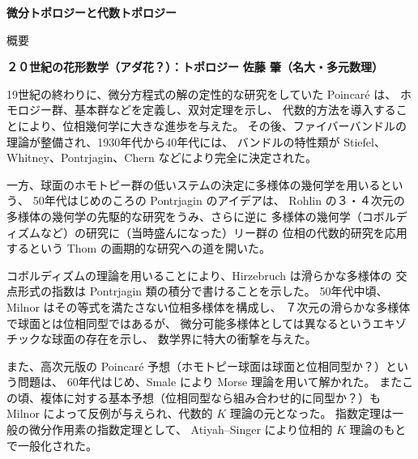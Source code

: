 \documentclass[uplatex,dvipdfmx]{jlreq}
\begin{document}
\begin{center}
  {\Huge\bfseries 微分トポロジーと代数トポロジー}
\end{center}

\vspace{10pt}

\begin{center}
  {\large 概要}
\end{center}

\newpage

\noindent
{\large\bfseries ２０世紀の花形数学（アダ花？）：トポロジー}
\hfill
{\large\bfseries 佐藤 肇（名大・多元数理）}

\medskip

19世紀の終わりに、微分方程式の解の定性的な研究をしていた Poincaré は、
ホモロジー群、基本群などを定義し、双対定理を示し、
代数的方法を導入することにより、位相幾何学に大きな進歩を与えた。
その後、ファイバーバンドルの理論が整備され、1930年代から40年代には、
バンドルの特性類が Stiefel、Whitney、Pontrjagin、Chern などにより完全に決定された。

一方、球面のホモトピー群の低いステムの決定に多様体の幾何学を用いるという、
50年代はじめのころの Pontrjagin のアイデアは、
Rohlin の３・４次元の多様体の幾何学の先駆的な研究をうみ、さらに逆に
多様体の幾何学（コボルディズムなど）の研究に（当時盛んになった）リー群の
位相の代数的研究を応用するという Thom の画期的な研究への道を開いた。

コボルディズムの理論を用いることにより、Hirzebruch は滑らかな多様体の
交点形式の指数は Pontrjagin 類の積分で書けることを示した。
50年代中頃、Milnor はその等式を満たさない位相多様体を構成し、
７次元の滑らかな多様体で球面とは位相同型ではあるが、
微分可能多様体としては異なるというエキゾチックな球面の存在を示し、
数学界に特大の衝撃を与えた。

また、高次元版の Poincaré 予想（ホモトピー球面は球面と位相同型か？）という問題は、
60年代はじめ、Smale により Morse 理論を用いて解かれた。
またこの頃、複体に対する基本予想（位相同型なら組み合わせ的に同型か？）も
Milnor によって反例が与えられ、代数的 $K$ 理論の元となった。
指数定理は一般の微分作用素の指数定理として、
Atiyah--Singer により位相的 $K$ 理論のもとで一般化された。
\end{document}
